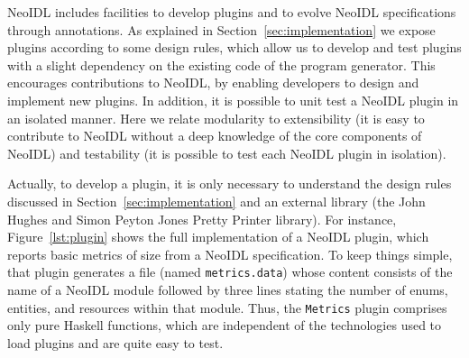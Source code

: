 \documentclass{ws-ijseke}
\newcommand{\neoidl}{NeoIDL}
\begin{document}
\neoidl{} includes facilities to develop plugins and to evolve \neoidl{} specifications 
through annotations. As explained in Section~\ref{sec:implementation} we expose plugins
according to some design rules, which allow us to develop and test plugins with a
slight dependency on the existing code of the program generator. 
This encourages contributions to \neoidl, by enabling 
developers to design and implement new
plugins. In addition, it is possible to unit test a \neoidl{} plugin in
an isolated manner. Here we relate modularity to extensibility (it is
easy to contribute to \neoidl{} without a deep knowledge of 
the core components of \neoidl) and testability (it is possible to
test each \neoidl{} plugin in isolation).

Actually, to develop a plugin, it is only necessary to understand the design
rules discussed in Section~\ref{sec:implementation} 
and an external library (the John Hughes and Simon Peyton Jones Pretty
Printer library). For instance, Figure~\ref{lst:plugin} shows the 
full implementation of a \neoidl{} plugin, which reports
basic metrics of size from a \neoidl{} specification. To keep things 
simple, that plugin generates a file (named \texttt{metrics.data})
whose content 
consists of the name of a \neoidl{} module followed by three lines 
stating the number of enums, entities, and resources within that
module. Thus, the \texttt{Metrics} plugin comprises only pure Haskell 
functions, which are independent of the technologies used 
to load plugins and are quite easy to test. 
\end{document}
